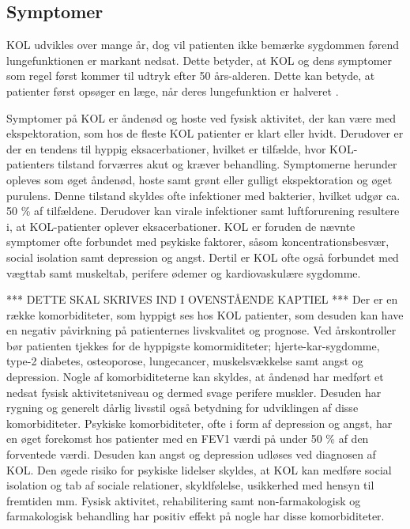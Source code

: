 \subsection{Symptomer}
KOL udvikles over mange år, dog vil patienten ikke bemærke sygdommen førend lungefunktionen er markant nedsat. Dette betyder, at KOL og dens symptomer som regel først kommer til udtryk efter 50 års-alderen\cite{Lange2015}. Dette kan betyde, at patienter først opsøger en læge, når deres lungefunktion er halveret \cite{dsam2016}.

Symptomer på KOL er åndenød og hoste ved fysisk aktivitet, der kan være med ekspektoration, som hos de fleste KOL patienter er klart eller hvidt.\cite{Basisbogen2016} Derudover er der en tendens til hyppig eksacerbationer, hvilket er tilfælde, hvor KOL-patienters tilstand forværres akut og kræver behandling. 
Symptomerne herunder opleves som øget åndenød, hoste samt grønt eller gulligt ekspektoration og øget purulens. Denne tilstand skyldes ofte infektioner med bakterier, hvilket udgør ca. 50 \% af tilfældene. Derudover kan virale infektioner samt luftforurening resultere i, at KOL-patienter oplever eksacerbationer.\cite{Basisbogen2016, dsam2016} KOL er foruden de nævnte symptomer ofte forbundet med psykiske faktorer, såsom koncentrationsbesvær, social isolation samt depression og angst. Dertil er KOL ofte også forbundet med vægttab samt muskeltab, perifere ødemer og kardiovaskulære sygdomme. \cite{dsam2016, McCarthy2015}

*** DETTE SKAL SKRIVES IND I OVENSTÅENDE KAPTIEL ***
Der er en række komorbiditeter, som hyppigt ses hos KOL patienter, som desuden kan have en negativ påvirkning på patienternes livskvalitet og prognose. Ved årskontroller bør patienten tjekkes for de hyppigste komormiditeter; hjerte-kar-sygdomme, type-2 diabetes, osteoporose, lungecancer, muskelsvækkelse samt angst og depression.
Nogle af komorbiditeterne kan skyldes, at åndenød har medført et nedsat fysisk aktivitetsniveau og dermed svage perifere muskler. Desuden har rygning og generelt dårlig livsstil også betydning for udviklingen af disse komorbiditeter. \cite{dsam2016}
Psykiske komorbiditeter, ofte i form af depression og angst, har en øget forekomst hos patienter med en FEV1 værdi på under 50 \% af den forventede værdi. Desuden kan angst og depression udløses ved diagnosen af KOL. Den øgede risiko for psykiske lidelser skyldes, at KOL kan medføre social isolation og tab af sociale relationer, skyldfølelse, usikkerhed med hensyn til fremtiden mm. \cite{dsam2016}
Fysisk aktivitet, rehabilitering samt non-farmakologisk og farmakologisk behandling har positiv effekt på nogle har disse komorbiditeter. \cite{dsam2016}


